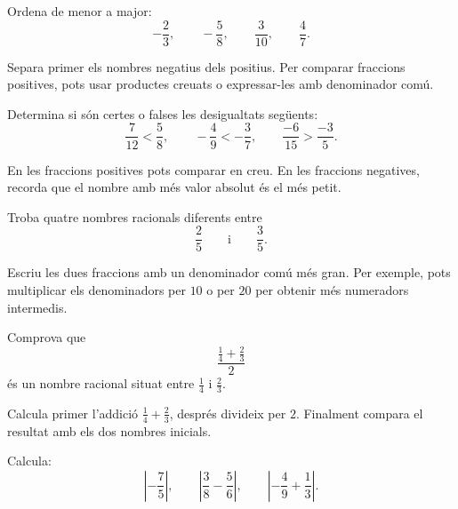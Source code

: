 \begin{exercici}[Ordre en \(\Q\)]
	Ordena de menor a major:
	\[
	-\frac{2}{3},
	\qquad
	-\frac{5}{8},
	\qquad
	\frac{3}{10},
	\qquad
	\frac{4}{7}.
	\]
\end{exercici}

\begin{indicacio}
	Separa primer els nombres negatius dels positius. Per comparar fraccions positives, pots usar productes creuats o expressar-les amb denominador comú.
\end{indicacio}

\begin{exercici}
	Determina si són certes o falses les desigualtats següents:
	\[
	\frac{7}{12}<\frac{5}{8},
	\qquad
	-\frac{4}{9}<-\frac{3}{7},
	\qquad
	\frac{-6}{15}>\frac{-3}{5}.
	\]
\end{exercici}

\begin{indicacio}
	En les fraccions positives pots comparar en creu. En les fraccions negatives, recorda que el nombre amb més valor absolut és el més petit.
\end{indicacio}

\begin{exercici}
	Troba quatre nombres racionals diferents entre
	\[
	\frac{2}{5}
	\qquad\text{i}\qquad
	\frac{3}{5}.
	\]
\end{exercici}

\begin{indicacio}
	Escriu les dues fraccions amb un denominador comú més gran. Per exemple, pots multiplicar els denominadors per \(10\) o per \(20\) per obtenir més numeradors intermedis.
\end{indicacio}

\begin{exercici}
	Comprova que
	\[
	\frac{\frac{1}{4}+\frac{2}{3}}{2}
	\]
	és un nombre racional situat entre \(\frac{1}{4}\) i \(\frac{2}{3}\).
\end{exercici}

\begin{indicacio}
	Calcula primer l'addició \(\frac{1}{4}+\frac{2}{3}\), després divideix per \(2\). Finalment compara el resultat amb els dos nombres inicials.
\end{indicacio}

\begin{exercici}
	Calcula:
	\[
	\left|-\frac{7}{5}\right|,
	\qquad
	\left|\frac{3}{8}-\frac{5}{6}\right|,
	\qquad
	\left|-\frac{4}{9}+\frac{1}{3}\right|.
	\]
\end{exercici}

